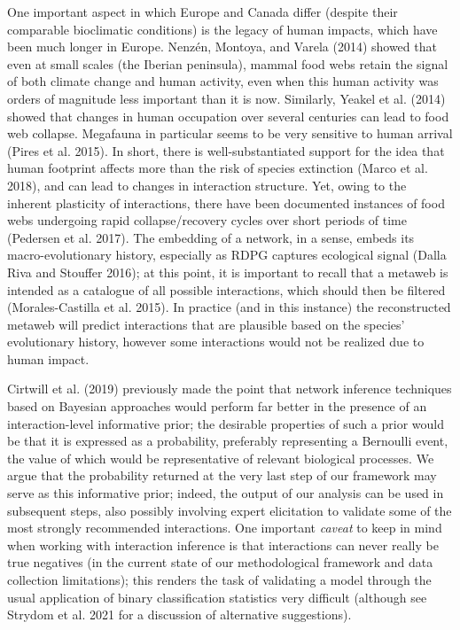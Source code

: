\documentclass[11pt]{article}
\begin{document}
One important aspect in which Europe and Canada differ (despite their
comparable bioclimatic conditions) is the legacy of human impacts, which
have been much longer in Europe. Nenzén, Montoya, and Varela (2014)
showed that even at small scales (the Iberian peninsula), mammal food
webs retain the signal of both climate change and human activity, even
when this human activity was orders of magnitude less important than it
is now. Similarly, Yeakel et al. (2014) showed that changes in human
occupation over several centuries can lead to food web collapse.
Megafauna in particular seems to be very sensitive to human arrival
(Pires et al. 2015). In short, there is well-substantiated support for
the idea that human footprint affects more than the risk of species
extinction (Marco et al. 2018), and can lead to changes in interaction
structure. Yet, owing to the inherent plasticity of interactions, there
have been documented instances of food webs undergoing rapid
collapse/recovery cycles over short periods of time (Pedersen et al.
2017). The embedding of a network, in a sense, embeds its
macro-evolutionary history, especially as RDPG captures ecological
signal (Dalla Riva and Stouffer 2016); at this point, it is important to
recall that a metaweb is intended as a catalogue of all possible
interactions, which should then be filtered (Morales-Castilla et al.
2015). In practice (and in this instance) the reconstructed metaweb will
predict interactions that are plausible based on the species'
evolutionary history, however some interactions would not be realized
due to human impact.

Cirtwill et al. (2019) previously made the point that network inference
techniques based on Bayesian approaches would perform far better in the
presence of an interaction-level informative prior; the desirable
properties of such a prior would be that it is expressed as a
probability, preferably representing a Bernoulli event, the value of
which would be representative of relevant biological processes. We argue
that the probability returned at the very last step of our framework may
serve as this informative prior; indeed, the output of our analysis can
be used in subsequent steps, also possibly involving expert elicitation
to validate some of the most strongly recommended interactions. One
important \emph{caveat} to keep in mind when working with interaction
inference is that interactions can never really be true negatives (in
the current state of our methodological framework and data collection
limitations); this renders the task of validating a model through the
usual application of binary classification statistics very difficult
(although see Strydom et al. 2021 for a discussion of alternative
suggestions).
\end{document}
